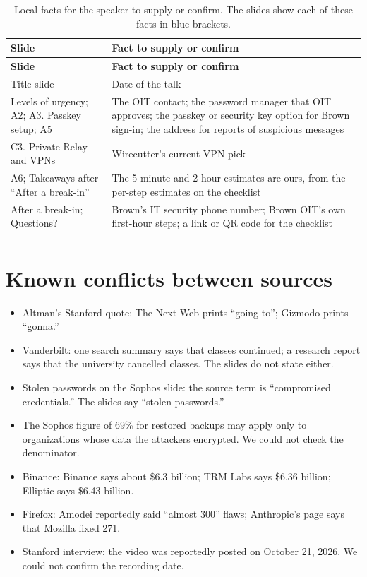 \documentclass[10pt]{article}
\begin{document}
\begin{longtable}{L{0.3\textwidth}L{0.62\textwidth}}
\caption{Local facts for the speaker to supply or confirm. The slides show each of these facts in blue brackets.}\\
\toprule
\textbf{Slide} & \textbf{Fact to supply or confirm}\\
\midrule
\endfirsthead
\toprule
\textbf{Slide} & \textbf{Fact to supply or confirm}\\
\midrule
\endhead
Title slide & Date of the talk\\\addlinespace
Levels of urgency; A2; A3. Passkey setup; A5 & The OIT contact; the password manager that OIT approves; the passkey or security key option for Brown sign-in; the address for reports of suspicious messages\\\addlinespace
C3. Private Relay and VPNs & Wirecutter's current VPN pick\\\addlinespace
A6; Takeaways after ``After a break-in'' & The 5-minute and 2-hour estimates are ours, from the per-step estimates on the checklist\\\addlinespace
After a break-in; Questions? & Brown's IT security phone number; Brown OIT's own first-hour steps; a link or QR code for the checklist\\\addlinespace
\bottomrule
\end{longtable}

\section*{Known conflicts between sources}
\begin{itemize}
\item Altman's Stanford quote: The Next Web prints ``going to''; Gizmodo prints ``gonna.''
\item Vanderbilt: one search summary says that classes continued; a research report says that the university cancelled classes. The slides do not state either.
\item Stolen passwords on the Sophos slide: the source term is ``compromised credentials.'' The slides say ``stolen passwords.''
\item The Sophos figure of 69\% for restored backups may apply only to organizations whose data the attackers encrypted. We could not check the denominator.
\item Binance: Binance says about \$6.3 billion; TRM Labs says \$6.36 billion; Elliptic says \$6.43 billion.
\item Firefox: Amodei reportedly said ``almost 300'' flaws; Anthropic's page says that Mozilla fixed 271.
\item Stanford interview: the video was reportedly posted on October 21, 2026. We could not confirm the recording date.
\end{itemize}
\end{document}
